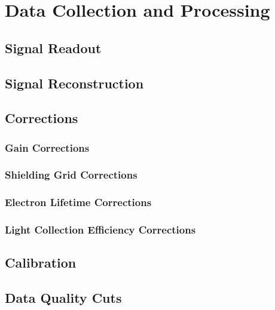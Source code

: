 \documentclass[herrin-thesis.tex]{subfiles}
\begin{document}
\chapter{Data Collection and Processing}
\label{ch:data}

\section{Signal Readout}

\section{Signal Reconstruction}

\section{Corrections}
\subsection{Gain Corrections}
\subsection{Shielding Grid Corrections}
\subsection{Electron Lifetime Corrections}
\subsection{Light Collection Efficiency Corrections}

\section{Calibration}

\section{Data Quality Cuts}
\end{document}
